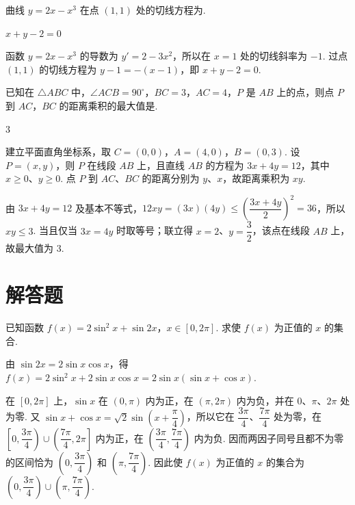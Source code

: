 \begin{problem}
曲线 \(y = 2x - x^3\) 在点 \((1,1)\) 处的切线方程为\fillinblank{}.
\end{problem}

\begin{answer}
\(x+y-2=0\)
\end{answer}

\begin{solution}
函数 \(y=2x-x^3\) 的导数为 \(y'=2-3x^2\)，所以在 \(x=1\) 处的切线斜率为 \(-1\). 过点 \((1,1)\) 的切线方程为 \(y-1=-(x-1)\)，即 \(x+y-2=0\).
\end{solution}



\begin{problem}
已知在 \(\triangle ABC\) 中，\(\angle ACB = 90^{\circ}\)，\(BC = 3\)，\(AC = 4\)，\(P\) 是 \(AB\) 上的点，则点 \(P\) 到 \(AC\)，\(BC\) 的距离乘积的最大值是\fillinblank{}.
\end{problem}

\begin{answer}
\(3\)
\end{answer}

\begin{solution}
建立平面直角坐标系，取 \(C=(0,0)\)，\(A=(4,0)\)，\(B=(0,3)\). 设 \(P=(x,y)\)，则 \(P\) 在线段 \(AB\) 上，且直线 \(AB\) 的方程为 \(3x+4y=12\)，其中 \(x\geqslant0\)、\(y\geqslant0\). 点 \(P\) 到 \(AC\)、\(BC\) 的距离分别为 \(y\)、\(x\)，故距离乘积为 \(xy\).

由 \(3x+4y=12\) 及基本不等式，\(12xy=(3x)(4y)\leqslant\left(\dfrac{3x+4y}{2}\right)^2=36\)，所以 \(xy\leqslant3\). 当且仅当 \(3x=4y\) 时取等号；联立得 \(x=2\)、\(y=\dfrac32\)，该点在线段 \(AB\) 上，故最大值为 \(3\).
\end{solution}



\section{解答题}
\begin{problem}
已知函数 \(f(x) = 2\sin^2 x + \sin 2x\)，\(x \in [0, 2\pi]\). 求使 \(f(x)\) 为正值的 \(x\) 的集合.
\end{problem}

\begin{solution}
由 \(\sin2x=2\sin x\cos x\)，得
\(f(x)=2\sin^2x+2\sin x\cos x=2\sin x(\sin x+\cos x)\).

在 \([0,2\pi]\) 上，\(\sin x\) 在 \((0,\pi)\) 内为正，在 \((\pi,2\pi)\) 内为负，并在 \(0\)、\(\pi\)、\(2\pi\) 处为零. 又
\(\sin x+\cos x=\sqrt2\sin\left(x+\dfrac\pi4\right)\)，所以它在 \(\dfrac{3\pi}{4}\)、\(\dfrac{7\pi}{4}\) 处为零，在 \(\left[0,\dfrac{3\pi}{4}\right)\cup\left(\dfrac{7\pi}{4},2\pi\right]\) 内为正，在 \(\left(\dfrac{3\pi}{4},\dfrac{7\pi}{4}\right)\) 内为负. 因而两因子同号且都不为零的区间恰为 \(\left(0,\dfrac{3\pi}{4}\right)\) 和 \(\left(\pi,\dfrac{7\pi}{4}\right)\). 因此使 \(f(x)\) 为正值的 \(x\) 的集合为 \(\left(0,\dfrac{3\pi}{4}\right)\cup\left(\pi,\dfrac{7\pi}{4}\right)\).
\end{solution}


